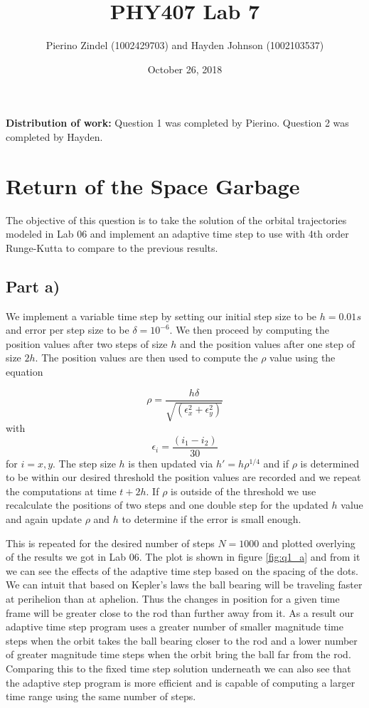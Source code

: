 \documentclass{article}
\title{PHY407 Lab 7}
\author{Pierino Zindel (1002429703) and Hayden Johnson (1002103537)}
\date{October 26, 2018}
\begin{document}
\maketitle

\noindent \textbf{Distribution of work:} Question 1 was completed by Pierino. Question 2 was completed by Hayden.

\section{Return of the Space Garbage}

The objective of this question is to take the solution of the orbital trajectories modeled in Lab 06 and implement an adaptive time step to use with 4th order Runge-Kutta to compare to the previous results.

\subsection{Part a)}
We implement a variable time step by setting our initial step size to be $h=0.01s$ and error per step size to be $\delta=10^{-6}$. We then proceed by computing the position values after two steps of size $h$ and the position values after one step of size $2h$. The position values are then used to compute the $\rho$ value using the equation

\begin{equation}
	\rho = \frac{h\delta}{\sqrt{(\epsilon_x^2 + \epsilon_y^2)}}
\end{equation}
with 
\begin{equation}
	\epsilon_i = \frac{(i_1-i_2)}{30}
\end{equation}
for $i=x,y$.
The step size $h$ is then updated via $h\prime = h\rho^{1/4}$ and if $\rho$ is determined to be within our desired threshold the position values are recorded and we repeat the computations at time $t+2h$. If $\rho$ is outside of the threshold we use recalculate the positions of two steps and one double step for the updated $h$ value and again update $\rho$ and $h$ to determine if the error is small enough.

This is repeated for the desired number of steps $N=1000$ and plotted overlying of the results we got in Lab 06. The plot is shown in figure \ref{fig:q1_a} and from it we can see the effects of the adaptive time step based on the spacing of the dots. We can intuit that based on Kepler's laws the ball bearing will be traveling faster at perihelion than at aphelion. Thus the changes in position for a given time frame will be greater close to the rod than further away from it. As a result our adaptive time step program uses a greater number of smaller magnitude time steps when the orbit takes the ball bearing closer to the rod and a lower number of greater magnitude time steps when the orbit bring the ball far from the rod. Comparing this to the fixed time step solution underneath we can also see that the adaptive step program is more efficient and is capable of computing a larger time range using the same number of steps. 
\end{document}
